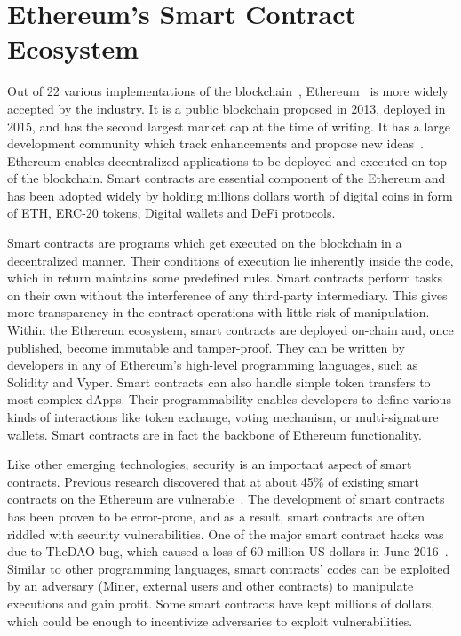 \section{Ethereum's Smart Contract Ecosystem}
Out of 22 various implementations of the blockchain~\cite{builtin2024}, Ethereum~\cite{EIP150} is more widely accepted by the industry. It is a public blockchain proposed in 2013, deployed in 2015, and has the second largest market cap at the time of writing. It has a large development community which track enhancements and propose new ideas~\cite{CoinDesk20}. Ethereum enables decentralized applications to be deployed and executed on top of the blockchain. Smart contracts are essential component of the Ethereum and has been adopted widely by holding millions dollars worth of digital coins in form of ETH, ERC-20 tokens, Digital wallets and DeFi protocols.

Smart contracts are programs which get executed on the blockchain in a decentralized manner. Their conditions of execution lie inherently inside the code, which in return maintains some predefined rules. Smart contracts perform tasks on their own without the interference of any third-party intermediary. This gives more transparency in the contract operations with little risk of manipulation. Within the Ethereum ecosystem, smart contracts are deployed on-chain and, once published, become immutable and tamper-proof. They can be written by developers in any of Ethereum's high-level programming languages, such as Solidity and Vyper. Smart contracts can also handle simple token transfers to most complex dApps. Their programmability enables developers to define various kinds of interactions like token exchange, voting mechanism, or multi-signature wallets. Smart contracts are in fact the backbone of Ethereum functionality.

Like other emerging technologies, security is an important aspect of smart contracts. Previous research discovered that at about 45\% of existing smart contracts on the Ethereum are vulnerable~\cite{SmartContractSecurity}. The development of smart contracts has been proven to be error-prone, and as a result, smart contracts are often riddled with security vulnerabilities. One of the major smart contract hacks was due to TheDAO bug, which caused a loss of 60 million US dollars in June 2016~\cite{TheDAOCoinDesk}. Similar to other programming languages, smart contracts' codes can be exploited by an adversary (\ie Miner, external users and other contracts) to manipulate executions and gain profit. Some smart contracts have kept millions of dollars, which could be enough to incentivize adversaries to exploit vulnerabilities.

